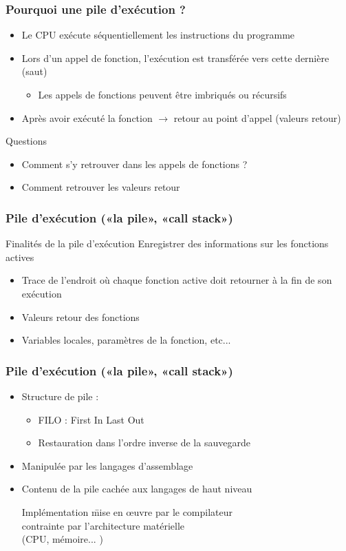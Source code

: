 \begin{frame}
\frametitle{Pourquoi une pile d'exécution ?}
\begin{itemize}
\item Le CPU exécute séquentiellement les instructions du programme
\item Lors d'un appel de fonction, l'exécution est transférée vers cette dernière (saut)
\begin{itemize}
\item Les appels de fonctions peuvent être imbriqués ou récursifs
\end{itemize}
\item Après avoir exécuté la fonction $\rightarrow$ retour au point d'appel (valeurs retour)
\end{itemize}
\begin{block}{Questions}
\begin{itemize}
\item Comment s'y retrouver dans les appels de fonctions ?
\item Comment retrouver les valeurs retour
\end{itemize}

\end{block}
\end{frame}

\begin{frame}
\frametitle{Pile d'exécution («la pile», «call stack»)}
\begin{block}{Finalités de la pile d'exécution}
Enregistrer des informations sur les fonctions actives
\begin{itemize}
\item Trace de l'endroit où chaque fonction active doit retourner à la fin de son exécution
\item Valeurs retour des fonctions
\item Variables locales, paramètres de la fonction, etc...
\end{itemize}
\end{block}
\end{frame}

\begin{frame}
\frametitle{Pile d'exécution («la pile», «call stack»)}
\begin{itemize}
\item Structure de pile :
\begin{itemize}
\item FILO : First In Last Out
\item Restauration dans l'ordre inverse de la sauvegarde
\end{itemize}

\item <2->Manipulée par les langages d'assemblage
\item <2->Contenu de la pile cachée aux langages de haut niveau
\begin{tabbing}
Implémentation \= mise en œuvre par le compilateur \\
\> contrainte par l'architecture matérielle \\ \>(CPU, mémoire... )
\end{tabbing}
\end{itemize}
\end{frame}


